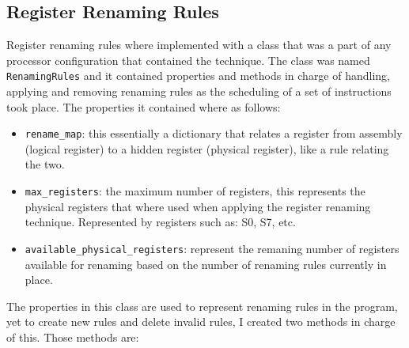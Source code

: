 \documentclass{article}
\begin{document}
\subsection{Register Renaming Rules}
Register renaming rules where implemented with a class that was a part of any processor configuration that contained the technique. The class was named \lstinline|RenamingRules| and it contained properties and methods in charge of handling, applying and removing renaming rules as the scheduling of a set of instructions took place. The properties it contained where as follows:

\begin{itemize}
    \item \lstinline|rename_map|: this essentially a dictionary that relates a register from assembly (logical register) to a hidden register (physical register), like a rule relating the two. 
    \item \lstinline|max_registers|: the maximum number of registers, this represents the physical registers that where used when applying the register renaming technique. Represented by registers such as: S0, S7, etc.
    \item \lstinline|available_physical_registers|: represent the remaning number of registers available for renaming based on the number of renaming rules currently in place. 
\end{itemize}

The properties in this class are used to represent renaming rules in the program, yet to create new rules and delete invalid rules, I created two methods in charge of this. Those methods are:
\end{document}
